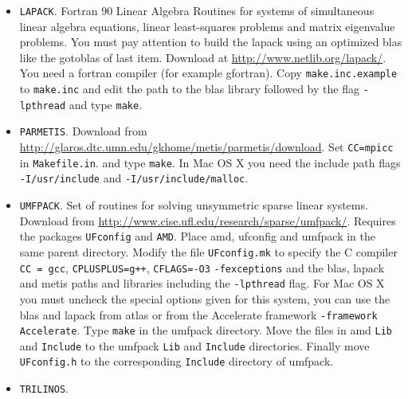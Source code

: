 \begin{itemize}
\item \verb!LAPACK!.
Fortran $90$ Linear Algebra Routines for systems of simultaneous linear algebra equations, linear least-squares problems
and matrix eigenvalue problems. You must pay attention to build the lapack using an optimized blas like the gotoblas of 
last item. Download at \url{http://www.netlib.org/lapack/}. You need a fortran compiler (for example gfortran).
Copy \verb!make.inc.example! to \verb!make.inc! and edit the path to the blas library followed by the flag \verb!-lpthread! 
and type \verb!make!. 

\item \verb!PARMETIS!.
Download from \url{http://glaros.dtc.umn.edu/gkhome/metis/parmetis/download}. Set \verb!CC=mpicc! 
in \verb!Makefile.in!. and type \verb!make!. In Mac OS X you need the include path flags
\verb!-I/usr/include! and \verb!-I/usr/include/malloc!.

\item \verb!UMFPACK!.
Set of routines for solving unsymmetric sparse linear systems. 
Download from \url{http://www.cise.ufl.edu/research/sparse/umfpack/}. Requires 
the packages \verb!UFconfig! and \verb!AMD!. Place amd, ufconfig and umfpack in the same parent directory. 
Modify the file \verb!UFconfig.mk! to specify the C compiler \verb!CC = gcc!, \verb!CPLUSPLUS=g++!, 
\verb!CFLAGS=-O3! 
\verb!-fexceptions! 
and the blas, lapack and metis paths and libraries including the \verb!-lpthread! flag. 
For Mac OS X you must uncheck the special options given for this system, you can use the blas and lapack 
from atlas or from the Accelerate framework \verb!-framework Accelerate!. 
Type \verb!make! in 
the umfpack directory. Move the files in amd \verb!Lib! and \verb!Include! to the umfpack \verb!Lib! and \verb!Include! directories.
Finally move \verb!UFconfig.h! to the corresponding \verb!Include! directory of umfpack.  

\item \verb!TRILINOS!.

\end{itemize}



